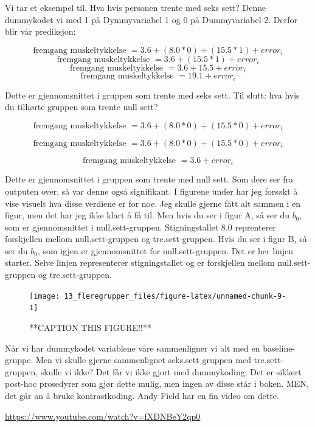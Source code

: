 \documentclass[
]{book}
\begin{document}
Vi tar et eksempel til. Hva hvis personen trente med seks sett? Denne dummykodet vi med 1 på Dymmyvariabel 1 og 0 på Dummyvariabel 2. Derfor blir vår prediksjon:

\[
\text{fremgang muskeltykkelse } = 3.6 + (8.0 * 0) + (15.5 * 1)  + error_i
\]
\[
\text{fremgang muskeltykkelse } = 3.6 + (15.5 * 1)  + error_i
\]
\[
\text{fremgang muskeltykkelse } = 3.6 + 15.5  + error_i
\]
\[
\text{fremgang muskeltykkelse } = 19.1 + error_i
\]

Dette er gjennomsnittet i gruppen som trente med seks sett. Til slutt: hva hvis du tilhørte gruppen som trente null sett?

\[
\text{fremgang muskeltykkelse } = 3.6 + (8.0 * 0) + (15.5 * 0)  + error_i
\]

\[
\text{fremgang muskeltykkelse } = 3.6 + (8.0 * 0) + (15.5 * 0)  + error_i
\]

\[
\text{fremgang muskeltykkelse } = 3.6  + error_i
\]

Dette er gjennomsnittet i gruppen som trente med null sett. Som dere ser fra outputen over, så var denne også signifikant. I figurene under har jeg forsøkt å vise visuelt hva disse verdiene er for noe. Jeg skulle gjerne fått alt sammen i en figur, men det har jeg ikke klart å få til. Men hvis du ser i figur A, så ser du \(b_0\), som er gjennomsnittet i null.sett-gruppen. Stigningstallet 8.0 reprenterer forskjellen mellom null.sett-gruppen og tre.sett-gruppen. Hvis du ser i figur B, så ser du \(b_0\), som igjen er gjennomsnittet for null.sett-gruppen. Det er her linjen starter. Selve linjen representerer stigningstallet og er forskjellen mellom null.sett-gruppen og tre.sett-gruppen.

\begin{figure}

{\centering \texttt{[image: 13\_fleregrupper\_files/figure-latex/unnamed-chunk-9-1]} 

}

\caption{**CAPTION THIS FIGURE!!**}\label{fig:unnamed-chunk-9}
\end{figure}

Når vi har dummykodet variablene våre sammenligner vi alt med en baseline-gruppe. Men vi skulle gjerne sammenlignet seks.sett gruppen med tre.sett-gruppen, skulle vi ikke? Det får vi ikke gjort med dummykoding. Det er sikkert post-hoc prosedyrer som gjør dette mulig, men ingen av disse står i boken. MEN, det går an å bruke kontrastkoding. Andy Field har en fin video om dette.

\url{https://www.youtube.com/watch?v=fXDNBeY2qp0}
\end{document}
